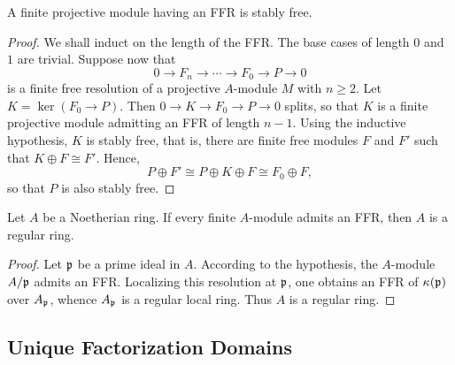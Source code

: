 \begin{lemma}
    A finite projective module having an FFR is stably free.
\end{lemma}
\begin{proof}
    We shall induct on the length of the FFR. The base cases of length $0$ and $1$ are trivial. Suppose now that 
    \begin{equation*}
        0\to F_n\to\cdots\to F_0\to P\to 0
    \end{equation*}
    is a finite free resolution of a projective $A$-module $M$ with $n\ge 2$. Let $K = \ker\left(F_0\to P\right)$. Then $0\to K\to F_0\to P\to 0$ splits, so that $K$ is a finite projective module admitting an FFR of length $n - 1$. Using the inductive hypothesis, $K$ is stably free, that is, there are finite free modules $F$ and $F'$ such that $K\oplus F\cong F'$. Hence, 
    \begin{equation*}
        P\oplus F'\cong P\oplus K\oplus F\cong F_0\oplus F,
    \end{equation*}
    so that $P$ is also stably free.
\end{proof}

\begin{lemma}
    Let $A$ be a Noetherian ring. If every finite $A$-module admits an FFR, then $A$ is a regular ring.
\end{lemma}
\begin{proof}
    Let $\mathfrak{p}$ be a prime ideal in $A$. According to the hypothesis, the $A$-module $A/\mathfrak{p}$ admits an FFR. Localizing this resolution at $\mathfrak{p}$, one obtains an FFR of $\kappa(\mathfrak{p})$ over $A_{\mathfrak{p}}$, whence $A_{\mathfrak{p}}$ is a regular local ring. Thus $A$ is a regular ring.
\end{proof}

\subsection{Unique Factorization Domains}

